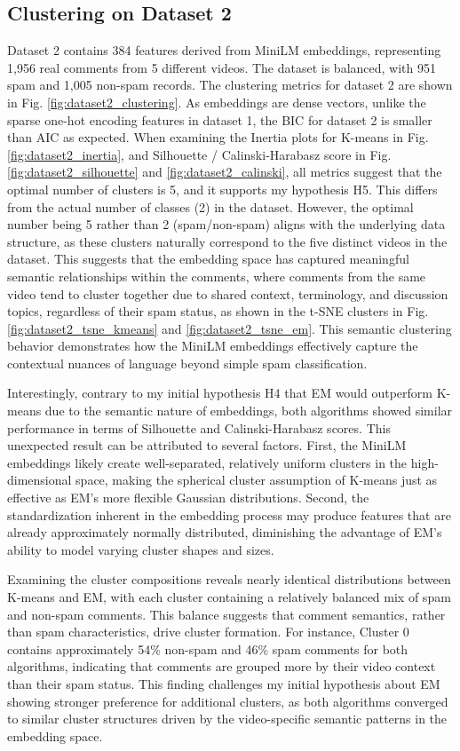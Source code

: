 \documentclass[conference]{IEEEtran}
\begin{document}
\subsection{Clustering on Dataset 2}
Dataset 2 contains 384 features derived from MiniLM embeddings, representing 1,956 real comments from 5 different videos. The dataset is balanced, with 951 spam and 1,005 non-spam records. The clustering metrics for dataset 2 are shown in Fig. \ref{fig:dataset2_clustering}. As embeddings are dense vectors, unlike the sparse one-hot encoding features in dataset 1, the BIC for dataset 2 is smaller than AIC as expected. 
When examining the Inertia plots for K-means in Fig. \ref{fig:dataset2_inertia}, and Silhouette / Calinski-Harabasz score in Fig. \ref{fig:dataset2_silhouette} and \ref{fig:dataset2_calinski}, all metrics suggest that the optimal number of clusters is 5, and it supports my hypothesis H5. This differs from the actual number of classes (2) in the dataset. 
However, the optimal number being 5 rather than 2 (spam/non-spam) aligns with the underlying data structure, as these clusters naturally correspond to the five distinct videos in the dataset. This suggests that the embedding space has captured meaningful semantic relationships within the comments, where comments from the same video tend to cluster together due to shared context, terminology, and discussion topics, regardless of their spam status, as shown in the t-SNE clusters in Fig. \ref{fig:dataset2_tsne_kmeans} and \ref{fig:dataset2_tsne_em}. This semantic clustering behavior demonstrates how the MiniLM embeddings effectively capture the contextual nuances of language beyond simple spam classification.

Interestingly, contrary to my initial hypothesis H4 that EM would outperform K-means due to the semantic nature of embeddings, both algorithms showed similar performance in terms of Silhouette and Calinski-Harabasz scores. This unexpected result can be attributed to several factors. First, the MiniLM embeddings likely create well-separated, relatively uniform clusters in the high-dimensional space, making the spherical cluster assumption of K-means just as effective as EM's more flexible Gaussian distributions. Second, the standardization inherent in the embedding process may produce features that are already approximately normally distributed, diminishing the advantage of EM's ability to model varying cluster shapes and sizes.

Examining the cluster compositions reveals nearly identical distributions between K-means and EM, with each cluster containing a relatively balanced mix of spam and non-spam comments. This balance suggests that comment semantics, rather than spam characteristics, drive cluster formation. For instance, Cluster 0 contains approximately 54\% non-spam and 46\% spam comments for both algorithms, indicating that comments are grouped more by their video context than their spam status. This finding challenges my initial hypothesis about EM showing stronger preference for additional clusters, as both algorithms converged to similar cluster structures driven by the video-specific semantic patterns in the embedding space.
\end{document}
